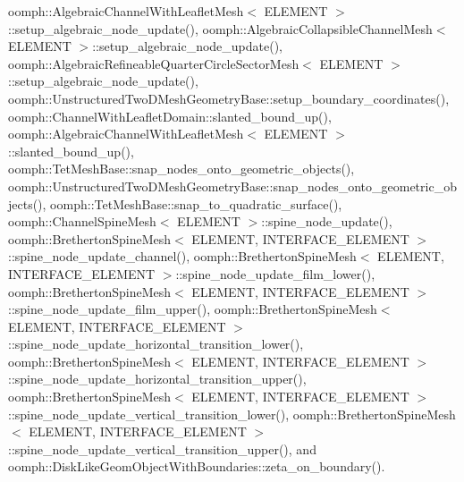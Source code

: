 oomph\+::\+Algebraic\+Channel\+With\+Leaflet\+Mesh$<$ E\+L\+E\+M\+E\+N\+T $>$\+::setup\+\_\+algebraic\+\_\+node\+\_\+update(), oomph\+::\+Algebraic\+Collapsible\+Channel\+Mesh$<$ E\+L\+E\+M\+E\+N\+T $>$\+::setup\+\_\+algebraic\+\_\+node\+\_\+update(), oomph\+::\+Algebraic\+Refineable\+Quarter\+Circle\+Sector\+Mesh$<$ E\+L\+E\+M\+E\+N\+T $>$\+::setup\+\_\+algebraic\+\_\+node\+\_\+update(), oomph\+::\+Unstructured\+Two\+D\+Mesh\+Geometry\+Base\+::setup\+\_\+boundary\+\_\+coordinates(), oomph\+::\+Channel\+With\+Leaflet\+Domain\+::slanted\+\_\+bound\+\_\+up(), oomph\+::\+Algebraic\+Channel\+With\+Leaflet\+Mesh$<$ E\+L\+E\+M\+E\+N\+T $>$\+::slanted\+\_\+bound\+\_\+up(), oomph\+::\+Tet\+Mesh\+Base\+::snap\+\_\+nodes\+\_\+onto\+\_\+geometric\+\_\+objects(), oomph\+::\+Unstructured\+Two\+D\+Mesh\+Geometry\+Base\+::snap\+\_\+nodes\+\_\+onto\+\_\+geometric\+\_\+objects(), oomph\+::\+Tet\+Mesh\+Base\+::snap\+\_\+to\+\_\+quadratic\+\_\+surface(), oomph\+::\+Channel\+Spine\+Mesh$<$ E\+L\+E\+M\+E\+N\+T $>$\+::spine\+\_\+node\+\_\+update(), oomph\+::\+Bretherton\+Spine\+Mesh$<$ E\+L\+E\+M\+E\+N\+T, I\+N\+T\+E\+R\+F\+A\+C\+E\+\_\+\+E\+L\+E\+M\+E\+N\+T $>$\+::spine\+\_\+node\+\_\+update\+\_\+channel(), oomph\+::\+Bretherton\+Spine\+Mesh$<$ E\+L\+E\+M\+E\+N\+T, I\+N\+T\+E\+R\+F\+A\+C\+E\+\_\+\+E\+L\+E\+M\+E\+N\+T $>$\+::spine\+\_\+node\+\_\+update\+\_\+film\+\_\+lower(), oomph\+::\+Bretherton\+Spine\+Mesh$<$ E\+L\+E\+M\+E\+N\+T, I\+N\+T\+E\+R\+F\+A\+C\+E\+\_\+\+E\+L\+E\+M\+E\+N\+T $>$\+::spine\+\_\+node\+\_\+update\+\_\+film\+\_\+upper(), oomph\+::\+Bretherton\+Spine\+Mesh$<$ E\+L\+E\+M\+E\+N\+T, I\+N\+T\+E\+R\+F\+A\+C\+E\+\_\+\+E\+L\+E\+M\+E\+N\+T $>$\+::spine\+\_\+node\+\_\+update\+\_\+horizontal\+\_\+transition\+\_\+lower(), oomph\+::\+Bretherton\+Spine\+Mesh$<$ E\+L\+E\+M\+E\+N\+T, I\+N\+T\+E\+R\+F\+A\+C\+E\+\_\+\+E\+L\+E\+M\+E\+N\+T $>$\+::spine\+\_\+node\+\_\+update\+\_\+horizontal\+\_\+transition\+\_\+upper(), oomph\+::\+Bretherton\+Spine\+Mesh$<$ E\+L\+E\+M\+E\+N\+T, I\+N\+T\+E\+R\+F\+A\+C\+E\+\_\+\+E\+L\+E\+M\+E\+N\+T $>$\+::spine\+\_\+node\+\_\+update\+\_\+vertical\+\_\+transition\+\_\+lower(), oomph\+::\+Bretherton\+Spine\+Mesh$<$ E\+L\+E\+M\+E\+N\+T, I\+N\+T\+E\+R\+F\+A\+C\+E\+\_\+\+E\+L\+E\+M\+E\+N\+T $>$\+::spine\+\_\+node\+\_\+update\+\_\+vertical\+\_\+transition\+\_\+upper(), and oomph\+::\+Disk\+Like\+Geom\+Object\+With\+Boundaries\+::zeta\+\_\+on\+\_\+boundary().

\mbox{\label{classoomph_1_1GeomObject_ad44a736d23dcd63af163a7d80b5c4dfa}} 
